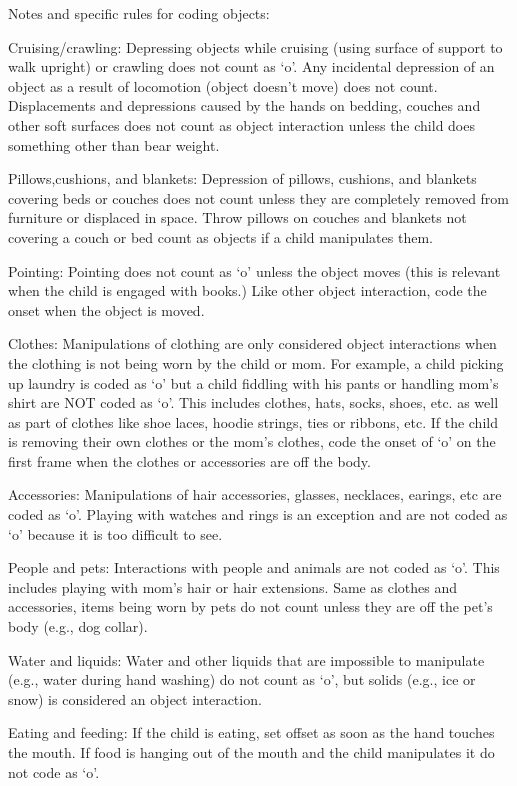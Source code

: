 \documentclass[
]{book}
\begin{document}
Notes and specific rules for coding objects:

Cruising/crawling: Depressing objects while cruising (using surface of support to walk upright) or crawling does not count as `o'. Any incidental depression of an object as a result of locomotion (object doesn't move) does not count. Displacements and depressions caused by the hands on bedding, couches and other soft surfaces does not count as object interaction unless the child does something other than bear weight.

Pillows,cushions, and blankets: Depression of pillows, cushions, and blankets covering beds or couches does not count unless they are completely removed from furniture or displaced in space. Throw pillows on couches and blankets not covering a couch or bed count as objects if a child manipulates them.

Pointing: Pointing does not count as `o' unless the object moves (this is relevant when the child is engaged with books.) Like other object interaction, code the onset when the object is moved.

Clothes: Manipulations of clothing are only considered object interactions when the clothing is not being worn by the child or mom. For example, a child picking up laundry is coded as `o' but a child fiddling with his pants or handling mom's shirt are NOT coded as `o'. This includes clothes, hats, socks, shoes, etc. as well as part of clothes like shoe laces, hoodie strings, ties or ribbons, etc. If the child is removing their own clothes or the mom's clothes, code the onset of `o' on the first frame when the clothes or accessories are off the body.

Accessories: Manipulations of hair accessories, glasses, necklaces, earings, etc are coded as `o'. Playing with watches and rings is an exception and are not coded as `o' because it is too difficult to see.

People and pets: Interactions with people and animals are not coded as `o'. This includes playing with mom's hair or hair extensions. Same as clothes and accessories, items being worn by pets do not count unless they are off the pet's body (e.g., dog collar).

Water and liquids: Water and other liquids that are impossible to manipulate (e.g., water during hand washing) do not count as `o', but solids (e.g., ice or snow) is considered an object interaction.

Eating and feeding: If the child is eating, set offset as soon as the hand touches the mouth. If food is hanging out of the mouth and the child manipulates it do not code as `o'.
\end{document}
